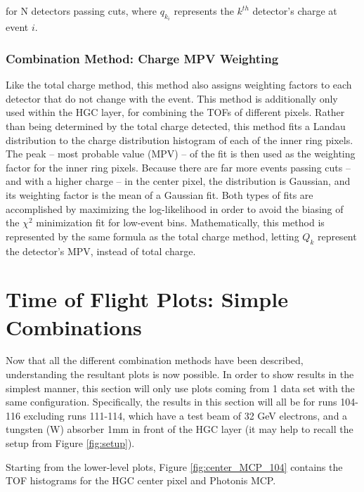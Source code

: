 \documentclass[12pt]{article}
\begin{document}
for N detectors passing cuts, where $q_{k_i}$ represents the $k^{th}$ detector's charge at event $i$.

\subsubsection{Combination Method: Charge MPV Weighting}
Like the total charge method, this method also assigns weighting factors to each detector that do not change with the event. 
This method is additionally only used within the HGC layer, for combining the TOFs of different pixels. 
Rather than being determined by the total charge detected, this method fits a Landau distribution to the charge distribution histogram of each of the inner ring pixels.
The peak -- most probable value (MPV) -- of the fit is then used as the weighting factor for the inner ring pixels. 
Because there are far more events passing cuts -- and with a higher charge -- in the center pixel, the distribution is Gaussian, and its weighting factor is the mean of a Gaussian fit.
Both types of fits are accomplished by maximizing the log-likelihood in order to avoid the biasing of the $\chi^2$ minimization fit for low-event bins.
Mathematically, this method is represented by the same formula as the total charge method, letting $Q_k$ represent the detector's MPV, instead of total charge.

\section{Time of Flight Plots: Simple Combinations}
Now that all the different combination methods have been described, understanding the resultant plots is now possible. 
In order to show results in the simplest manner, this section will only use plots coming from 1 data set with the same configuration. 
Specifically, the results in this section will all be for runs 104-116 excluding runs 111-114, which have a test beam of 32 GeV electrons, and a tungsten (W) absorber 1mm in front of the HGC layer (it may help to recall the setup from Figure \ref{fig:setup}).

Starting from the lower-level plots, Figure \ref{fig:center_MCP_104} contains the TOF histograms for the HGC center pixel and Photonis MCP.
\end{document}
